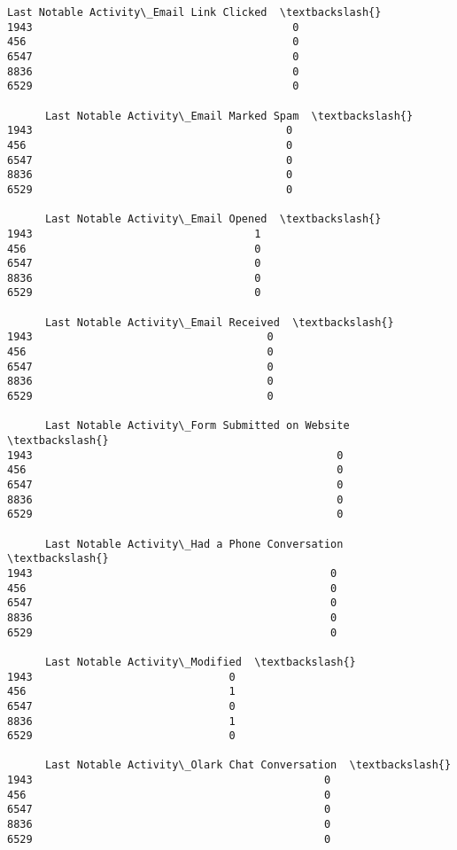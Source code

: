 \documentclass[11pt]{article}
\begin{document}
\begin{tcolorbox}[breakable, size=fbox, boxrule=.5pt, pad at break*=1mm, opacityfill=0]
\begin{Verbatim}[commandchars=\\\{\}]
      Last Notable Activity\_Email Link Clicked  \textbackslash{}
1943                                         0
456                                          0
6547                                         0
8836                                         0
6529                                         0

      Last Notable Activity\_Email Marked Spam  \textbackslash{}
1943                                        0
456                                         0
6547                                        0
8836                                        0
6529                                        0

      Last Notable Activity\_Email Opened  \textbackslash{}
1943                                   1
456                                    0
6547                                   0
8836                                   0
6529                                   0

      Last Notable Activity\_Email Received  \textbackslash{}
1943                                     0
456                                      0
6547                                     0
8836                                     0
6529                                     0

      Last Notable Activity\_Form Submitted on Website  \textbackslash{}
1943                                                0
456                                                 0
6547                                                0
8836                                                0
6529                                                0

      Last Notable Activity\_Had a Phone Conversation  \textbackslash{}
1943                                               0
456                                                0
6547                                               0
8836                                               0
6529                                               0

      Last Notable Activity\_Modified  \textbackslash{}
1943                               0
456                                1
6547                               0
8836                               1
6529                               0

      Last Notable Activity\_Olark Chat Conversation  \textbackslash{}
1943                                              0
456                                               0
6547                                              0
8836                                              0
6529                                              0


\end{Verbatim}
\end{tcolorbox}
\end{document}
